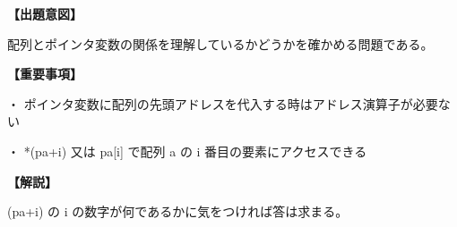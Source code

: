 \noindent \textbf{【出題意図】}

\noindent 配列とポインタ変数の関係を理解しているかどうかを確かめる問題である。

\vspace{1em}
\noindent \textbf{【重要事項】}

\medskip
\noindent ・ ポインタ変数に配列の先頭アドレスを代入する時はアドレス演算子が必要ない

\medskip
\noindent ・ *(pa+i) 又は pa[i] で配列 a の i 番目の要素にアクセスできる

\vspace{1em}
\noindent \textbf{【解説】}

\noindent *(pa+i) の i の数字が何であるかに気をつければ答は求まる。
